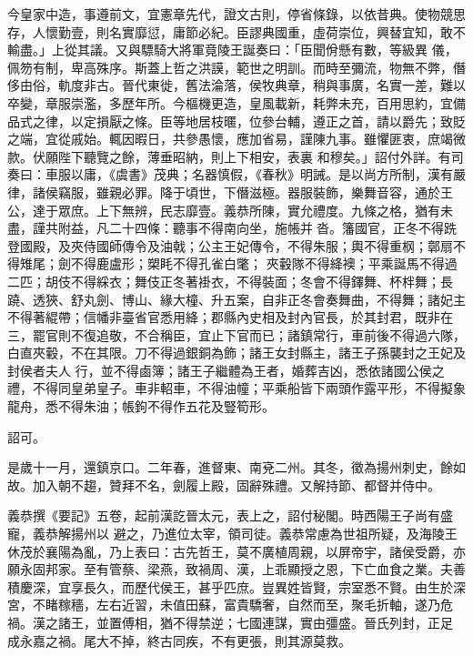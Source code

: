 \begin{pinyinscope}
 今皇家中造，事遵前文，宜憲章先代，證文古則，停省條錄，以依昔典。使物競思存，人懷勤壹，則名實靡愆，庸節必紀。臣謬典國重，虛荷崇位，興替宜知，敢不輸盡。」上從其議。又與驃騎大將軍竟陵王誕奏曰：「臣聞佾懸有數，等級異
 儀，佩笏有制，卑高殊序。斯蓋上哲之洪謨，範世之明訓。而時至彌流，物無不弊，僭侈由俗，軌度非古。晉代東徙，舊法淪落，侯牧典章，稍與事廣，名實一差，難以卒變，章服崇濫，多歷年所。今樞機更造，皇風載新，耗弊未充，百用思約，宜備品式之律，以定損厭之條。臣等地居枝暱，位參台輔，遵正之首，請以爵先；致貶之端，宜從戚始。輒因暇日，共參愚懷，應加省易，謹陳九事。雖懼匪衷，庶竭微款。伏願陛下聽覽之餘，薄垂昭納，則上下相安，表裏
 和穆矣。」詔付外詳。有司奏曰：車服以庸，《虞書》茂典；名器慎假，《春秋》明誡。是以尚方所制，漢有嚴律，諸侯竊服，雖親必罪。降于頃世，下僭滋極。器服裝飾，樂舞音容，通於王公，達于眾庶。上下無辨，民志靡壹。義恭所陳，實允禮度。九條之格，猶有未盡，謹共附益，凡二十四條：聽事不得南向坐，施帳并沓。籓國官，正冬不得跣登國殿，及夾侍國師傳令及油戟；公主王妃傳令，不得朱服；輿不得重㭎；鄣扇不得雉尾；劍不得鹿盧形；槊眊不得孔雀白氅；
 夾轂隊不得絳襖；平乘誕馬不得過二匹；胡伎不得綵衣；舞伎正冬著褂衣，不得裝面；冬會不得鐸舞、杯柈舞；長蹺、透狹、舒丸劍、博山、緣大橦、升五案，自非正冬會奏舞曲，不得舞；諸妃主不得著緄帶；信幡非臺省官悉用絳；郡縣內史相及封內官長，於其封君，既非在三，罷官則不復追敬，不合稱臣，宜止下官而已；諸鎮常行，車前後不得過六隊，白直夾轂，不在其限。刀不得過銀銅為飾；諸王女封縣主，諸王子孫襲封之王妃及封侯者夫人
 行，並不得鹵簿；諸王子繼體為王者，婚葬吉凶，悉依諸國公侯之禮，不得同皇弟皇子。車非軺車，不得油幢；平乘船皆下兩頭作露平形，不得擬象龍舟，悉不得朱油；帳鉤不得作五花及豎筍形。



 詔可。



 是歲十一月，還鎮京口。二年春，進督東、南兗二州。其冬，徵為揚州刺史，餘如故。加入朝不趨，贊拜不名，劍履上殿，固辭殊禮。又解持節、都督并侍中。



 義恭撰《要記》五卷，起前漢訖晉太元，表上之，詔付秘閣。時西陽王子尚有盛寵，義恭解揚州以
 避之，乃進位太宰，領司徒。義恭常慮為世祖所疑，及海陵王休茂於襄陽為亂，乃上表曰：古先哲王，莫不廣植周親，以屏帝宇，諸侯受爵，亦願永固邦家。至有管蔡、梁燕，致禍周、漢，上乖顯授之恩，下亡血食之業。夫善積慶深，宜享長久，而歷代侯王，甚乎匹庶。豈異姓皆賢，宗室悉不賢。由生於深宮，不睹稼穡，左右近習，未值田蘇，富貴驕奢，自然而至，聚毛折軸，遂乃危禍。漢之諸王，並置傅相，猶不得禁逆；七國連謀，實由彊盛。晉氏列封，正足
 成永嘉之禍。尾大不掉，終古同疾，不有更張，則其源莫救。




\end{pinyinscope}
